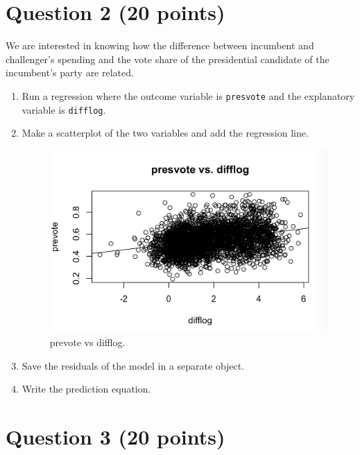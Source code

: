 \documentclass[12pt,letterpaper]{article}
\begin{document}
\newpage

\section*{Question 2 (20 points)}
\noindent We are interested in knowing how the difference between incumbent and challenger's spending and the vote share of the presidential candidate of the incumbent's party are related.	\vspace{.25cm}
	\begin{enumerate}
		\item Run a regression where the outcome variable is \texttt{presvote} and the explanatory variable is \texttt{difflog}.	
			  
		\item Make a scatterplot of the two variables and add the regression line. 
			  
			\begin{figure}[h!]
				\includegraphics[width=\linewidth]{PS32}
				\caption{prevote vs difflog.}
				\label{fig:PS32}
			\end{figure}
		\item Save the residuals of the model in a separate object.	
			  
		\item Write the prediction equation.
			  
	\end{enumerate}
	
	\newpage	
\section*{Question 3 (20 points)}
\end{document}
